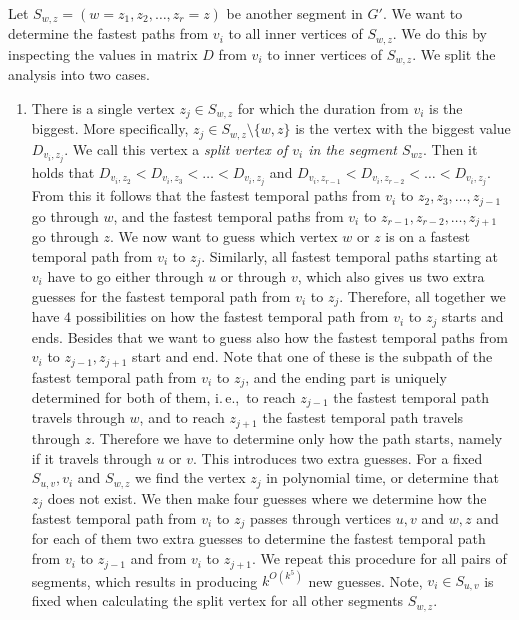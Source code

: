 \documentclass[a4paper,UKenglish,cleveref, autoref, thm-restate]{lipics-v2021}
\newcommand{\ie}{i.\,e.,\ }
\begin{document}
\begin{enumerate}[G-1.]
	Let 
	$S_{w,z} = (w=z_1,z_2, \dots, z_r = z)$ be another segment in $G'$.
	We want to determine the fastest paths from $v_i$ to all inner vertices of $S_{w,z}$. We do this by inspecting the values in matrix $D$ from $v_i$ to inner vertices of $S_{w,z}$.
	We split the analysis into two cases.
	\begin{enumerate}
		\item 
		There is a single vertex $z_j \in S_{w,z}$ for which the duration from $v_i$ is the biggest.
		More specifically, $z_j \in S_{w,z} \setminus \{w,z\}$ is the vertex with the biggest value  $D_{v_i,z_j}$.
		We call this vertex a \emph{split vertex of $v_i$ in the segment $S_{wz}$}.
		Then it holds that $D_{v_i,z_2} < D_{v_i,z_3} < \dots < D_{v_i,z_j}$ and 
		$D_{v_i,z_{r-1}} < D_{v_i,z_{r-2}} < \dots < D_{v_i,z_j}$.
		From this it follows that the fastest temporal paths from $v_i$ to $z_2, z_3, \dots, z_{j-1}$ go through $w$,
		and 
		the fastest temporal paths from $v_i$ to $z_{r-1}, z_{r-2}, \dots, z_{j+1}$ go through $z$.
		We now want to guess which vertex $w$ or $z$ is on a fastest temporal path from $v_i$ to $z_j$.
		Similarly,
		all fastest temporal paths starting at $v_i$ have to go either through $u$ or through $v$,
		which also gives us two extra guesses for the fastest temporal path from $v_i$ to $z_j$.
		Therefore, all together we have $4$ possibilities on how the fastest temporal path from $v_i$ to $z_j$ starts and ends.
		Besides that we want to guess also how the fastest temporal paths from $v_i$ to $z_{j-1}, z_{j+1}$ start and end.
		Note that one of these is the subpath of the fastest temporal path from $v_i$ to $z_j$, and the ending part is uniquely determined for both of them,
		\ie to reach $z_{j-1}$ the fastest temporal path travels through $w$, and to reach $z_{j+1}$ the fastest temporal path travels through $z$.
		Therefore we have to determine only how the path starts, namely if it travels through $u$ or $v$.
		This introduces two extra guesses.
		For a fixed $S_{u,v}, v_i$ and $S_{w,z}$ we find the vertex $z_j$ in polynomial time, 
		or determine that $z_j$ does not exist.
		We then make four guesses where we determine how the fastest temporal path from $v_i$ to $z_j$ passes through vertices $u,v$ and $w,z$ and 
		for each of them two extra guesses to determine the fastest temporal path from $v_i$ to $z_{j-1}$ and from $v_i$ to $z_{j+1}$.
		We repeat this procedure for all pairs of segments,
		which results in producing $k^{O(k^5)}$ new guesses.
		Note, $v_i \in S_{u,v}$ is fixed when calculating the split vertex for all other segments $S_{w,z}$.

\end{enumerate}
\end{enumerate}
\end{document}
